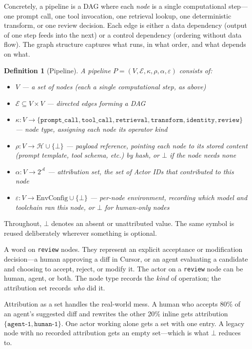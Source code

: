 \documentclass{article}
\newtheorem{definition}{Definition}
\begin{document}
Concretely, a pipeline is a DAG where each \emph{node} is a single
computational step---one prompt call, one tool invocation, one retrieval
lookup, one deterministic transform, or one review decision. Each edge is
either a data dependency (output of one step feeds into the next) or a control
dependency (ordering without data flow). The graph structure captures what runs,
in what order, and what depends on what.

\begin{definition}[Pipeline]
A \emph{pipeline} $P = (V, \mathcal{E}, \kappa, \rho, \alpha, \varepsilon)$
consists of:
\begin{itemize}[nosep]
  \item $V$ --- a set of nodes (each a single computational step, as above)
  \item $\mathcal{E} \subseteq V \times V$ --- directed edges forming a DAG
  \item $\kappa : V \to \{\texttt{prompt\_call}, \texttt{tool\_call},
    \texttt{retrieval}, \texttt{transform}, \texttt{identity},
    \texttt{review}\}$ --- node type, assigning each node its operator kind
  \item $\rho : V \to \mathcal{H} \cup \{\bot\}$ --- payload reference,
    pointing each node to its stored content (prompt template, tool schema,
    etc.) by hash, or $\bot$ if the node needs none
  \item $\alpha : V \to 2^{\mathcal{A}}$ --- attribution set, the set of Actor
    IDs that contributed to this node
  \item $\varepsilon : V \to \text{EnvConfig} \cup \{\bot\}$ --- per-node
    environment, recording which model and toolchain ran this node, or $\bot$
    for human-only nodes
\end{itemize}
\end{definition}

\noindent Throughout, $\bot$ denotes an absent or unattributed value. The same
symbol is reused deliberately wherever something is optional.

A word on \texttt{review} nodes. They represent an explicit acceptance or
modification decision---a human approving a diff in Cursor, or an agent
evaluating a candidate and choosing to accept, reject, or modify it. The
actor on a \texttt{review} node can be human, agent, or both. The node type
records the \emph{kind} of operation; the attribution set records \emph{who}
did it.

Attribution as a set handles the real-world mess. A human who accepts 80\% of
an agent's suggested diff and rewrites the other 20\% inline gets attribution
$\{\texttt{agent-1}, \texttt{human-1}\}$. One actor working alone gets a set
with one entry. A legacy node with no recorded attribution gets an empty
set---which is what $\bot$ reduces to.
\end{document}
